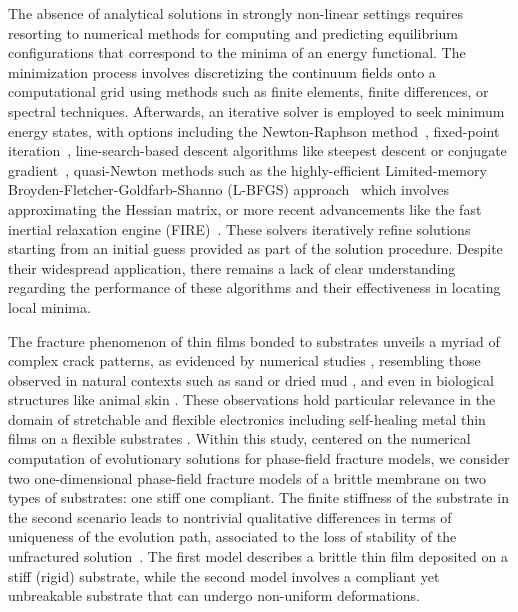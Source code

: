 The absence of analytical solutions in strongly non-linear settings requires resorting to numerical methods for computing and predicting equilibrium configurations that correspond to the minima of an energy functional. The minimization process involves discretizing the continuum fields onto a computational grid using methods such as finite elements, finite differences, or spectral techniques. Afterwards, an iterative solver is employed to seek minimum energy states, with options including the Newton-Raphson method~\cite{Wick2017-bo}, fixed-point iteration~\cite{Chen2019-mn,Kirkesaether_Brun2020-wa,Storvik2021-cd}, line-search-based descent algorithms like steepest descent or conjugate gradient~\cite{Stiefel1952-fw,Dai1999-hz}, quasi-Newton methods such as the highly-efficient Limited-memory Broyden-Fletcher-Goldfarb-Shanno (\textsc{L-BFGS}) approach~\cite{Liu1989-kl} which involves approximating the Hessian matrix, or more recent advancements like the fast inertial relaxation engine (\textsc{FIRE})~\cite{Guenole2020-tc}. These solvers iteratively refine solutions starting from an initial guess provided as part of the solution procedure. Despite their widespread application, there remains a lack of clear understanding regarding the performance of these algorithms and their effectiveness in locating local minima. 


The fracture phenomenon of thin films bonded to substrates unveils a myriad of complex crack patterns, as evidenced by numerical studies \cite{Baldelli2014-ho,Alessi2019-bx,Hu2020-nt,Salman2021-mn,Baldelli2021-gc}, resembling those observed in natural contexts such as sand or dried mud \cite{Goehring2010-xz}, and even in biological structures like animal skin \cite{Qin2014-wz}. These observations hold particular relevance in the domain of stretchable and flexible electronics \cite{Faurie2019-to,Godard2022-ss} including  self-healing metal thin films on a flexible substrates \cite{Trost2024-ca}. 
Within this study, centered on the numerical computation of evolutionary solutions for phase-field fracture models, we consider two one-dimensional phase-field fracture models of a brittle membrane on two types of substrates: one stiff one compliant. The finite stiffness of the substrate in the second scenario leads to nontrivial qualitative differences in terms of uniqueness of the evolution path, associated to the loss of stability of the unfractured solution~\cite{Baldelli2014-ho,Kuhn2015-rt,Baldelli2021-gc,Harandi2023-cd}.
The first model describes a brittle thin film deposited on a stiff (rigid) substrate, while the second model involves a compliant yet unbreakable substrate that can undergo non-uniform deformations. 

